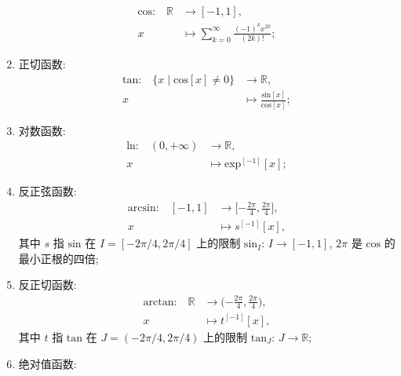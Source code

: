 \begin{definition}
\begin{enumerate}
              \begin{align*}
                  \text{$\mathrm{cos}$:} \quad
                  \mathbb{R} & \to [-1, 1],                                                 \\
                  x          & \mapsto \sum_{k = 0}^{\infty} {\frac{(-1)^k x^{2k}}{(2k)!}};
              \end{align*}
        \item 正切函数:
              \begin{align*}
                  \text{$\mathrm{tan}$:} \quad
                  \{ x \mid \mathrm{cos} {[x]} \neq 0 \} & \to \mathbb{R},                                        \\
                  x                                      & \mapsto \frac{\mathrm{sin} {[x]}}{\mathrm{cos} {[x]}};
              \end{align*}
        \item 对数函数:
              \begin{align*}
                  \text{$\mathrm{ln}$:} \quad
                  (0, +\infty) & \to \mathbb{R},                    \\
                  x            & \mapsto \mathrm{exp}^{[-1]} {[x]};
              \end{align*}
        \item 反正弦函数:
              \begin{align*}
                  \text{$\mathrm{arcsin}$:} \quad
                  [-1, 1] & \to \bigg[ {-\frac{2\pi}{4}}, \frac{2\pi}{4} \bigg], \\
                  x       & \mapsto s^{[-1]} {[x]},
              \end{align*}
              其中 $s$ 指 $\mathrm{sin}$ 在 $I = [-2\pi/4, 2\pi/4]$ 上的限制 $\mathrm{sin}_I$: $I \to [-1, 1]$, $2\pi$ 是 $\mathrm{cos}$ 的最小正根的四倍;
        \item 反正切函数:
              \begin{align*}
                  \text{$\mathrm{arctan}$:} \quad
                  \mathbb{R} & \to \bigg( {-\frac{2\pi}{4}}, \frac{2\pi}{4} \bigg), \\
                  x          & \mapsto t^{[-1]} {[x]},
              \end{align*}
              其中 $t$ 指 $\mathrm{tan}$ 在 $J = (-2\pi/4, 2\pi/4)$ 上的限制 $\mathrm{tan}_J$: $J \to \mathbb{R}$;
        \item 绝对值函数:
              \begin{align*}

\end{align*}
\end{enumerate}
\end{definition}
